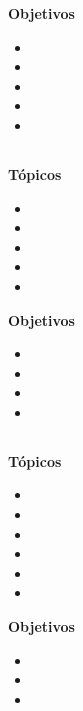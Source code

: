 \textbf{Objetivos}
\begin{itemize}
	\item \ALSIETEObjUNO
	\item \ALSIETEObjDOS
	\item \ALSIETEObjTRES
	\item \ALSIETEObjCUATRO
	\item \ALSIETEObjCINCO
\end{itemize}

\subsection{\ALOCHODef }\label{sec:BOK-AL8}

\textbf{Tópicos}
\begin{itemize}
	\item \ALOCHOTopicAnalisis
	\item \ALOCHOTopicAlgoritmos
	\item \ALOCHOTopicAlgoritmosaleatorios
	\item \ALOCHOTopicProgramacion
	\item \ALOCHOTopicOptimizacion
\end{itemize}

\textbf{Objetivos}
\begin{itemize}
	\item \ALOCHOObjUNO
	\item \ALOCHOObjDOS
	\item \ALOCHOObjTRES
	\item \ALOCHOObjCUATRO
\end{itemize}

\subsection{\ALNUEVEDef }\label{sec:BOK-AL9}

\textbf{Tópicos}
\begin{itemize}
	\item \ALNUEVETopicRevision
	\item \ALNUEVETopicCriptografia
	\item \ALNUEVETopicCriptografiade
	\item \ALNUEVETopicFirmas
	\item \ALNUEVETopicProtocolos
	\item \ALNUEVETopicAplicaciones
\end{itemize}

\textbf{Objetivos}
\begin{itemize}
	\item \ALNUEVEObjUNO
	\item \ALNUEVEObjDOS
	\item \ALNUEVEObjTRES
\end{itemize}

